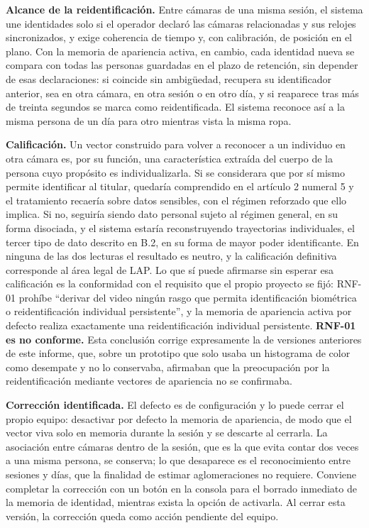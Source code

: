 \textbf{Alcance de la reidentificación.} Entre cámaras de una misma sesión, el
sistema une identidades solo si el operador declaró las cámaras relacionadas y
sus relojes sincronizados, y exige coherencia de tiempo y, con calibración, de
posición en el plano. Con la memoria de apariencia activa, en cambio, cada
identidad nueva se compara con todas las personas guardadas en el plazo de
retención, sin depender de esas declaraciones: si coincide sin ambigüedad,
recupera su identificador anterior, sea en otra cámara, en otra sesión o en
otro día, y si reaparece tras más de treinta segundos se marca como
reidentificada. El sistema reconoce así a la misma persona de un día para otro
mientras vista la misma ropa.

\textbf{Calificación.} Un vector construido para volver a reconocer a un
individuo en otra cámara es, por su función, una característica extraída del
cuerpo de la persona cuyo propósito es individualizarla. Si se considerara que
por sí mismo permite identificar al titular, quedaría comprendido en el
artículo 2 numeral 5 y el tratamiento recaería sobre datos sensibles, con el
régimen reforzado que ello implica. Si no, seguiría siendo dato personal sujeto
al régimen general, en su forma disociada, y el sistema estaría
reconstruyendo trayectorias individuales, el tercer tipo de dato descrito en
B.2, en su forma de mayor poder identificante. En ninguna de las dos lecturas
el resultado es neutro, y la calificación definitiva corresponde al área legal
de LAP. Lo que sí puede afirmarse sin esperar esa calificación es la
conformidad con el requisito que el propio proyecto se fijó: RNF-01 prohíbe
\enquote{derivar del video ningún rasgo que permita identificación biométrica o
reidentificación individual persistente}, y la memoria de apariencia activa por
defecto realiza exactamente una reidentificación individual persistente.
\textbf{RNF-01 es no conforme.} Esta conclusión corrige expresamente la de
versiones anteriores de este informe, que, sobre un prototipo que solo usaba
un histograma de color como desempate y no lo conservaba, afirmaban que la
preocupación por la reidentificación mediante vectores de apariencia no se
confirmaba.

\textbf{Corrección identificada.} El defecto es de configuración y lo puede
cerrar el propio equipo: desactivar por defecto la memoria de apariencia, de
modo que el vector viva solo en memoria durante la sesión y se descarte al
cerrarla. La asociación entre cámaras dentro de la sesión, que es la que evita
contar dos veces a una misma persona, se conserva; lo que desaparece es el
reconocimiento entre sesiones y días, que la finalidad de estimar
aglomeraciones no requiere. Conviene completar la corrección con un botón en la
consola para el borrado inmediato de la memoria de identidad, mientras exista
la opción de activarla. Al cerrar esta versión, la corrección queda como
acción pendiente del equipo.

